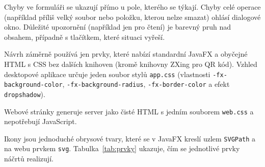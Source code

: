 Chyby ve formuláři se ukazují přímo u pole, kterého se týkají. Chyby celé operace (například příliš velký soubor nebo položku, kterou nelze smazat) ohlásí dialogové okno. Důležité upozornění (například jen pro čtení) je barevný pruh nad obsahem, případně s tlačítkem, které situaci vyřeší.

Návrh záměrně používá jen prvky, které nabízí standardní JavaFX a obyčejné HTML s CSS bez dalších knihoven (kromě knihovny ZXing pro QR kód). Vzhled desktopové aplikace určuje jeden soubor stylů \texttt{app.css} (vlastnosti \texttt{-fx-background-color}, \texttt{-fx-background-radius}, \texttt{-fx-border-color} a efekt \texttt{dropshadow}).

Webové stránky generuje server jako čisté HTML s jedním souborem \texttt{web.css} a nepotřebují JavaScript.

Ikony jsou jednoduché obrysové tvary, které se v JavaFX kreslí uzlem \texttt{SVGPath} a na webu prvkem \texttt{svg}. Tabulka~\ref{tab:prvky} ukazuje, čím se jednotlivé prvky náčrtů realizují.

